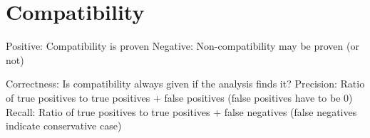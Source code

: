 \section{Compatibility}

Positive: Compatibility is proven
Negative: Non-compatibility may be proven (or not)

{Correctness: Is compatibility always given if the analysis finds it?}
{Precision: Ratio of true positives to true positives + false positives (false positives have to be 0)}
{Recall: Ratio of true positives to true positives + false negatives (false negatives indicate conservative case)}


